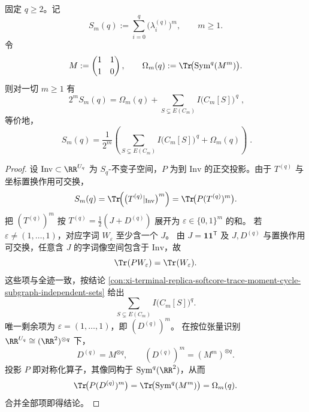 \begin{conclusion}[例外幂和的循环子图展开与对称化替换项]\label{con:xi-terminal-replica-softcore-exceptional-power-sum-cycle-sector-replacement}
固定 \(q\ge 2\)。记
\[
S_m(q):=\sum_{i=0}^{q}\bigl(\lambda_i^{(q)}\bigr)^m,\qquad m\ge1.
\]
令
\[
M:=\begin{pmatrix}1&1\\[2pt]1&0\end{pmatrix},\qquad
\Omega_m(q):=\Tr\!\bigl(\mathrm{Sym}^q(M^m)\bigr).
\]
则对一切 \(m\ge 1\) 有
\[
\boxed{\;
2^mS_m(q)=\Omega_m(q)+\sum_{S\subsetneq E(C_m)} I\!\bigl(C_m[S]\bigr)^{\,q}\; } ,
\]
等价地，
\[
\boxed{\;
S_m(q)=\frac1{2^m}\left(\sum_{S\subsetneq E(C_m)} I\!\bigl(C_m[S]\bigr)^{\,q}+\Omega_m(q)\right)\; }.
\]
\end{conclusion}
\begin{proof}
设 \(\mathrm{Inv}\subset\RR^{U_q}\) 为 \(S_q\)-不变子空间，\(P\) 为到 \(\mathrm{Inv}\) 的正交投影。由于 \(T^{(q)}\) 与坐标置换作用可交换，
\[
S_m(q)=\Tr\!\Bigl(\bigl(T^{(q)}|_{\mathrm{Inv}}\bigr)^m\Bigr)=\Tr\!\bigl(P(T^{(q)})^m\bigr).
\]
把 \((T^{(q)})^m\) 按 \(T^{(q)}=\frac12(J+D^{(q)})\) 展开为 \(\varepsilon\in\{0,1\}^m\) 的和。
若 \(\varepsilon\neq(1,\dots,1)\)，对应字词 \(W_\varepsilon\) 至少含一个 \(J\)。
由 \(J=\mathbf 1\mathbf 1^{\mathsf T}\) 及 \(J,D^{(q)}\) 与置换作用可交换，任意含 \(J\) 的字词像空间包含于 \(\mathrm{Inv}\)，故
\[
\Tr(PW_\varepsilon)=\Tr(W_\varepsilon).
\]
这些项与全迹一致，按结论
\ref{con:xi-terminal-replica-softcore-trace-moment-cycle-subgraph-independent-sets}
给出
\[
\sum_{S\subsetneq E(C_m)}I\!\bigl(C_m[S]\bigr)^q.
\]
唯一剩余项为 \(\varepsilon=(1,\dots,1)\)，即 \((D^{(q)})^m\)。
在按位张量识别 \(\RR^{U_q}\cong(\RR^2)^{\otimes q}\) 下，
\[
D^{(q)}=M^{\otimes q},\qquad (D^{(q)})^m=(M^m)^{\otimes q}.
\]
投影 \(P\) 即对称化算子，其像同构于 \(\mathrm{Sym}^q(\RR^2)\)，从而
\[
\Tr\!\bigl(P(D^{(q)})^m\bigr)=\Tr\!\bigl(\mathrm{Sym}^q(M^m)\bigr)=\Omega_m(q).
\]
合并全部项即得结论。
\end{proof}

